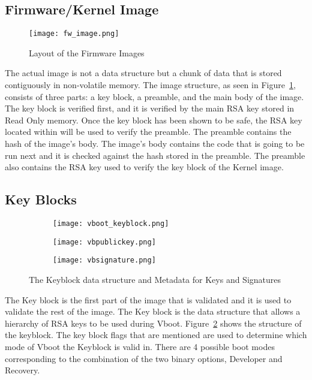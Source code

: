 \subsection{Firmware/Kernel Image}

\begin{figure}
    \centering
    \texttt{[image: fw\_image.png]}
    \caption{Layout of the Firmware Images~\cite{vboot-data-structures}}
    \label{fig:vboot_images}
\end{figure}

The actual image is not a data structure but a chunk of data that is stored contiguously in non-volatile memory.
The image structure, as seen in Figure~\ref{fig:vboot_images}, consists of three parts: a key block, a preamble, and the main body of the image.
The key block is verified first, and it is verified by the main RSA key stored in Read Only memory.
Once the key block has been shown to be safe, the RSA key located within will be used to verify the preamble.
The preamble contains the hash of the image's body.
The image's body contains the code that is going to be run next and it is checked against the hash stored in the preamble.
The preamble also contains the RSA key used to verify the key block of the Kernel image.

\subsection{Key Blocks}\label{sec:key_block}

\begin{figure}
\begin{subfigure}{.5\textwidth}
  \centering
  \texttt{[image: vboot\_keyblock.png]}
\end{subfigure}
\begin{subfigure}{.20\textwidth}
  \centering
  \texttt{[image: vbpublickey.png]}
\end{subfigure}
\begin{subfigure}{.20\textwidth}
  \centering
  \texttt{[image: vbsignature.png]}
\end{subfigure}
\caption{The Keyblock data structure and Metadata for Keys and Signatures}
\label{fig:vboot_keyblock}
\end{figure}

The Key block is the first part of the image that is validated and it is used to validate the rest of the image.
The Key block is the data structure that allows a hierarchy of RSA keys to be used during Vboot.
Figure~\ref{fig:vboot_keyblock} shows the structure of the keyblock. 
The key block flags that are mentioned are used to determine which mode of Vboot the Keyblock is valid in. 
There are 4 possible boot modes corresponding to the combination of the two binary options, Developer and Recovery.

